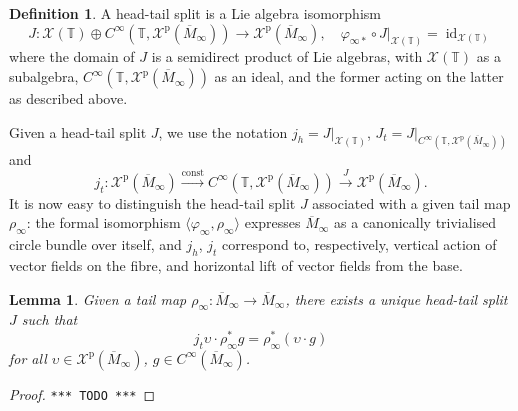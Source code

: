\documentclass{article}
\def\MISS{\texttt{*** TODO ***}}
\def\TT{\mathbb{T}}
\def\XX{\mathcal{X}}
\DeclareMathOperator{\id}{\mathrm{id}}
\def\p{\mathrm{p}}
\newtheorem{lem}{Lemma}
\theoremstyle{definition}
\newtheorem{defn}{Definition}
\begin{document}
\begin{defn}
A head-tail split is a Lie algebra isomorphism
$$
J : \XX(\TT) \oplus C^\infty(\TT, \XX^\p(\overline M_\infty)) \to \XX^\p(\overline M_\infty),\quad
        \varphi_{\infty*}\circ J|_{\XX(\TT)} = \id_{\XX(\TT)}
$$
where the domain of $J$ is a semidirect product of Lie algebras, with 
        $\XX(\TT)$ as a subalgebra, $C^\infty(\TT,\XX^\p(\overline M_\infty))$ as an ideal,
        and the former acting on the latter as described above. 
\end{defn}
Given a head-tail split $J$, we use the notation $ j_h=J|_{\XX(\TT)}$,
$J_t = J|_{C^\infty(\TT,\XX^\p(\overline M_\infty))}$
and $$ j_t : \XX^\p(\overline M_\infty)\xrightarrow{\mathrm{const}}C^\infty(\TT,\XX^\p(\overline M_\infty))
\xrightarrow{J} \XX^\p(\overline M_\infty).$$
It is now easy to distinguish the head-tail split $J$
associated with a given tail map $\rho_\infty$:
the formal isomorphism $\langle \varphi_\infty,\rho_\infty\rangle$
expresses $\overline M_\infty$
as a canonically trivialised circle bundle over itself,
and $j_h$, $j_t$
correspond to, respectively, vertical action of vector fields on the fibre, and
horizontal lift of vector fields from the base.
\begin{lem}\label{lem:hts}
        Given a tail map $\rho_\infty : \overline M_\infty \to \overline M_\infty$,
        there exists a unique head-tail split $J$
        such that $$ j_t \upsilon \cdot \rho_\infty^* g = \rho_\infty^* (\upsilon \cdot g)$$
        for all $\upsilon \in \XX^\p(\overline M_\infty)$, $g \in C^\infty(\overline M_\infty)$.
\end{lem}
\begin{proof}\MISS{}\end{proof}
\end{document}
